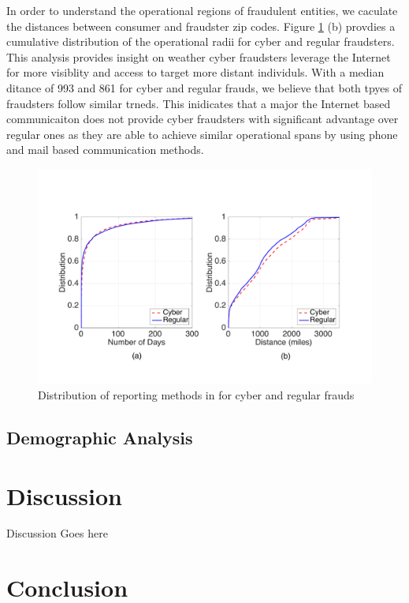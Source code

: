 \documentclass[conference]{IEEEtran}
\begin{document}
In order to understand the operational regions of fraudulent entities, we caculate the distances between consumer and fraudster zip codes. Figure \ref{reportingfig} (b) provdies a cumulative distribution of the operational radii for cyber and regular fraudsters.  This analysis provides insight on weather cyber fraudsters leverage the Internet for more visiblity and access to target more distant individuls. With a median ditance of 993 and 861 for cyber and regular frauds, we believe that both tpyes of fraudsters follow similar trneds. This inidicates that a major the Internet based communicaiton does not provide cyber fraudsters with significant advantage over regular ones as they are able to achieve similar operational spans by using phone and mail based communication methods.

\begin{figure}[t]
\centering
  \includegraphics[scale=0.28]{graphics/dist_days.pdf}
  \caption{Distribution of reporting methods in for cyber and regular frauds}
  \label{reportingfig}
\end{figure}


\subsection{Demographic Analysis}\label{fraudsters}

\section{Discussion}\label{discussion}
Discussion Goes here
\section{Conclusion}\label{conclusion}
\end{document}
